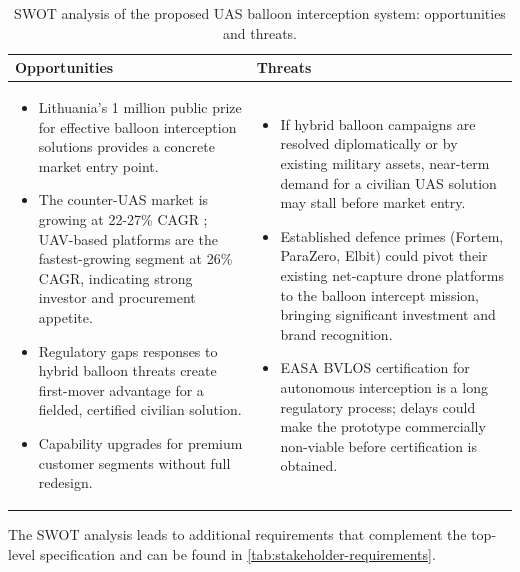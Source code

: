  \begin{table}[H]
\centering
\caption{SWOT analysis of the proposed UAS balloon interception system: opportunities and threats.}
\vspace{-10pt}
\label{tab:swot_opportunities_threats}
\begin{tabular}{@{}p{7.6cm}|p{7.6cm}@{}}
\toprule
\textbf{Opportunities} & \textbf{Threats} \\
\midrule
\vspace{-0.7\baselineskip}
\begin{itemize}[leftmargin=*,nosep,topsep=0pt,partopsep=0pt]
  \item Lithuania's \texteuro{}1 million public prize for effective balloon interception solutions \cite{RFE/RLBelarusService2025UpBoth} provides a concrete market entry point.
  \item The counter-UAS market is growing at 22-27\% CAGR \cite{MordorIntelligence2025Anti-Drone20252030, GrandViewResearch2025Anti-Drone20252033}; UAV-based platforms are the fastest-growing segment at 26\% CAGR, indicating strong investor and procurement appetite.
  \item Regulatory gaps responses to hybrid balloon threats create first-mover advantage for a fielded, certified civilian solution.
  \item Capability upgrades for premium customer segments without full redesign.
\end{itemize}
&
\vspace{-0.7\baselineskip}
\begin{itemize}[leftmargin=*,nosep,topsep=0pt,partopsep=0pt]
  \item If hybrid balloon campaigns are resolved diplomatically or by existing military assets, near-term demand for a civilian UAS solution may stall before market entry.
  \item Established defence primes (Fortem, ParaZero, Elbit) could pivot their existing net-capture drone platforms to the balloon intercept mission, bringing significant investment and brand recognition.
  \item EASA BVLOS certification for autonomous interception is a long regulatory process; delays could make the prototype commercially non-viable before certification is obtained.
\end{itemize}
\\
\bottomrule
\end{tabular}
\end{table}
The SWOT analysis leads to additional requirements that complement the top-level specification and can be found in \autoref{tab:stakeholder-requirements}.


